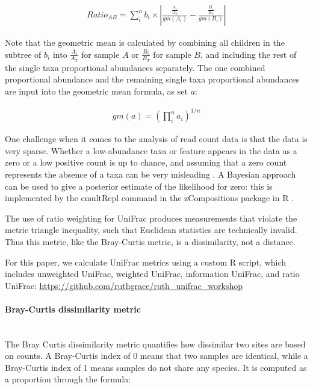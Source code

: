 \documentclass[10pt,letterpaper]{article}
\begin{document}
\begin{align*}
Ratio_{AB} = \sum_{i}^{n} b_{i} \times \left| \frac{\frac{A_{i}}{A_{T}}}{gm(A_{i})} - \frac{\frac{B_{i}}{B_{T}}}{{gm(B_{i})}} \right|
\end{align*}

Note that the geometric mean is calculated by combining all children in the subtree of $b_{i}$ into $\frac{A_{i}}{A_{T}}$ for sample $A$ or $\frac{B_{i}}{B_{T}}$ for sample $B$, and including the rest of the single taxa proportional abundances separately. The one combined proportional abundance and the remaining single taxa proportional abundances are input into the geometric mean formula, as set $a$:

\begin{align*}
gm(a) = \left( \prod_{i}^{n} a_{i}\right)^{1/n}
\end{align*}

One challenge when it comes to the analysis of read count data is that the data is very sparse. Whether a low-abundance taxa or feature appears in the data as a zero or a low positive count is up to chance, and assuming that a zero count represents the absence of a taxa can be very misleading \cite{fernandes2013anova}. A Bayesian approach can be used to give a posterior estimate of the likelihood for zero: this is implemented by the cmultRepl command in the zCompositions package in R \cite{palarea2015zcompositions}.

The use of ratio weighting for UniFrac produces measurements that violate the metric triangle inequality, such that Euclidean statistics are technically invalid. Thus this metric, like the Bray-Curtis metric, is a dissimilarity, not a distance.

For this paper, we calculate UniFrac metrics using a custom R script, which includes unweighted UniFrac, weighted UniFrac, information UniFrac, and ratio UniFrac: \url{https://github.com/ruthgrace/ruth_unifrac_workshop}

\paragraph{Bray-Curtis dissimilarity metric}\mbox{}\\
The Bray Curtis dissimilarity metric \cite{beals1984bray} quantifies how dissimilar two sites are based on counts. A Bray-Curtis index of 0 means that two samples are identical, while a Bray-Curtis index of 1 means samples do not share any species. It is computed as a proportion through the formula:
\end{document}
